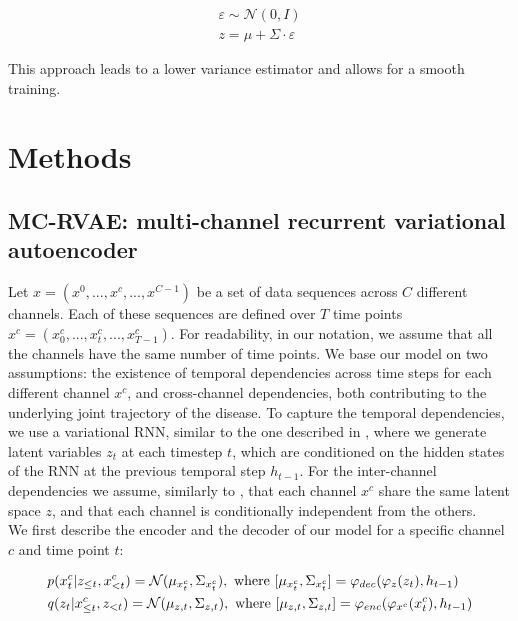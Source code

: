 \begin{equation}
\begin{split}
    \varepsilon \sim \mathcal{N}(0,I) \\
    z = \mu + \Sigma \cdot \varepsilon
\end{split}
\end{equation}

This approach leads to a lower variance estimator and allows for a smooth training.

\section{Methods}
\label{rnn:methods}

\subsection{MC-RVAE: multi-channel recurrent variational autoencoder}

Let $x = (x^0,...,x^c,...,x^{C-1})$ be a set of data sequences across $C$ different channels. Each of these sequences are defined over $T$ time points  $x^c = (x^c_{0},...,x^c_{t},...,x^c_{T-1})$. For readability, in our notation, we assume that all the channels have the same number of time points. We base our model on two assumptions: the existence of temporal dependencies across time steps for each different channel $x^c$, and cross-channel dependencies, both contributing to the underlying joint trajectory of the disease. To capture the temporal dependencies, we use a variational RNN, similar to the one described in \cite{Chung2015}, where we generate latent variables $z_t$ at each timestep $t$, which are conditioned on the hidden states of the RNN at the previous temporal step $h_{t-1}$. For the inter-channel dependencies we assume, similarly to \cite{Antelmi2019}, that each channel $x^c$ share the same latent space $z$, and that each channel is conditionally independent from the others. \\

We first describe the encoder and the decoder of our model for a specific channel $c$ and time point $t$:

\begin{equation} 
\begin{aligned} \label{rnn:eq:generative}
\displaystyle
& \mathit{p}(x^c_t | z_{\leq t}, x^c_{< t}) = \mathcal{N}(\mu_{x^c_t},\Sigma_{x^c_t}), \text{ where } [\mu_{x^c_t},\Sigma_{x^c_t}] = \varphi_{dec}(\varphi_{z}(z_t), h_{t-1}) \\
& \mathit{q}(z_t | x^c_{\leq t}, z_{< t}) = \mathcal{N}(\mu_{z,t},\Sigma_{z,t}), \text{ where } [ \mu_{z,t},\Sigma_{z,t}] = \varphi_{enc}(\varphi_{x^c}(x^c_{t}), h_{t-1}) \\
\end{aligned}
\end{equation}

